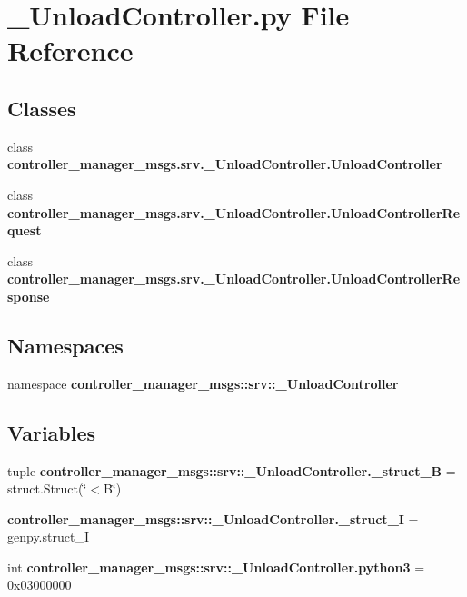 \section{\-\_\-\-Unload\-Controller.\-py \-File \-Reference}
\label{__UnloadController_8py}
\subsection*{\-Classes}
\begin{DoxyCompactItemize}
\item 
class {\bf controller\-\_\-manager\-\_\-msgs.\-srv.\-\_\-\-Unload\-Controller.\-Unload\-Controller}
\item 
class {\bf controller\-\_\-manager\-\_\-msgs.\-srv.\-\_\-\-Unload\-Controller.\-Unload\-Controller\-Request}
\item 
class {\bf controller\-\_\-manager\-\_\-msgs.\-srv.\-\_\-\-Unload\-Controller.\-Unload\-Controller\-Response}
\end{DoxyCompactItemize}
\subsection*{\-Namespaces}
\begin{DoxyCompactItemize}
\item 
namespace {\bf controller\-\_\-manager\-\_\-msgs\-::srv\-::\-\_\-\-Unload\-Controller}
\end{DoxyCompactItemize}
\subsection*{\-Variables}
\begin{DoxyCompactItemize}
\item 
tuple {\bf controller\-\_\-manager\-\_\-msgs\-::srv\-::\-\_\-\-Unload\-Controller.\-\_\-struct\-\_\-\-B} = struct.\-Struct(\char`\"{}$<$\-B\char`\"{})
\item 
{\bf controller\-\_\-manager\-\_\-msgs\-::srv\-::\-\_\-\-Unload\-Controller.\-\_\-struct\-\_\-\-I} = genpy.\-struct\-\_\-\-I
\item 
int {\bf controller\-\_\-manager\-\_\-msgs\-::srv\-::\-\_\-\-Unload\-Controller.\-python3} = 0x03000000
\end{DoxyCompactItemize}
